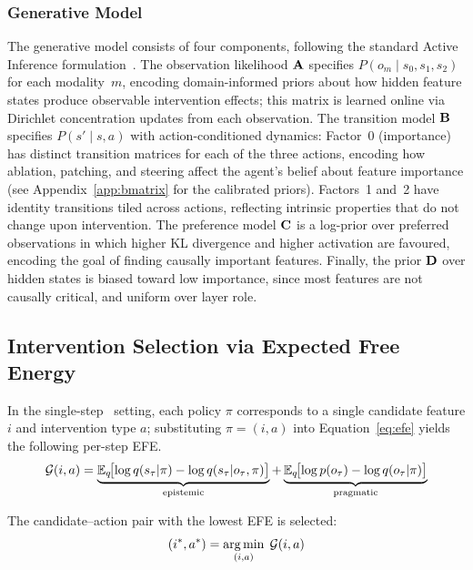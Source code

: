 \subsubsection{Generative Model}

The generative model consists of four components, following the
standard Active Inference formulation~\cite{Friston2017,Parr2022}.
The observation likelihood $\mathbf{A}$ specifies
$P(o_m \mid s_0, s_1, s_2)$ for each modality~$m$, encoding
domain-informed priors about how hidden feature states produce
observable intervention effects; this matrix is learned online via
Dirichlet concentration updates from each observation.  The
transition model $\mathbf{B}$ specifies $P(s' \mid s, a)$ with
action-conditioned dynamics: Factor~0 (importance) has distinct
transition matrices for each of the three actions, encoding how
ablation, patching, and steering affect the agent's belief about
feature importance (see Appendix~\ref{app:bmatrix} for the
calibrated priors).  Factors~1 and~2 have identity transitions
tiled across actions, reflecting intrinsic properties that do not
change upon intervention.  The preference model $\mathbf{C}$
is a log-prior over preferred observations in which higher KL
divergence and higher activation are favoured, encoding the goal of
finding causally important features.  Finally, the prior $\mathbf{D}$
over hidden states is biased toward low importance, since most
features are not causally critical, and uniform over layer role.


\subsection{Intervention Selection via Expected Free Energy}

In the single-step \ACD\ setting, each policy $\pi$ corresponds to a
single candidate feature $i$ and intervention type $a$; substituting
$\pi = (i, a)$ into Equation~\ref{eq:efe} yields the following per-step EFE.
\begin{equation}
  \label{eq:efe_agent}
  \mathcal{G}(i, a) = \underbrace{\mathbb{E}_{q}\!\bigl[\log q(s_\tau | \pi) - \log q(s_\tau | o_\tau, \pi)\bigr]}_{\text{epistemic}} + \underbrace{\mathbb{E}_{q}\!\bigl[\log p(o_\tau) - \log q(o_\tau | \pi)\bigr]}_{\text{pragmatic}}
\end{equation}

The candidate--action pair with the lowest EFE is selected:
\begin{equation}
  \label{eq:efe_select}
  (i^*, a^*) = \operatorname*{arg\,min}_{(i,a)}\; \mathcal{G}(i, a)
\end{equation}

